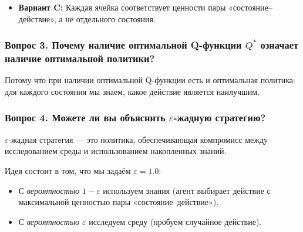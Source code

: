 \documentclass[11pt,a4paper]{article}
\begin{document}
\begin{itemize}
\tightlist
\item
  \textbf{Вариант C:} Каждая ячейка соответствует ценности пары «состояние--действие», а не отдельного состояния.
\end{itemize}

\subsubsection{\texorpdfstring{Вопрос 3. Почему наличие оптимальной Q-функции \(Q^*\) означает наличие оптимальной политики?}{Вопрос 3. Почему наличие оптимальной Q-функции Q* означает наличие оптимальной политики?}}\label{q3-why-if-we-have-an-optimal-q-function-q-we-have-an-optimal-policy-1}

Потому что при наличии оптимальной Q-функции есть и оптимальная политика: для каждого состояния мы знаем, какое действие является наилучшим.


\subsubsection{\texorpdfstring{Вопрос 4. Можете ли вы объяснить \(\varepsilon\)-жадную стратегию?}{Вопрос 4. Можете ли вы объяснить epsilon-жадную стратегию?}}\label{q4-can-you-explain-what-is-epsilon-greedy-strategy-1}

\(\varepsilon\)-жадная стратегия --- это политика, обеспечивающая компромисс между исследованием среды и использованием накопленных знаний.

Идея состоит в том, что мы задаём \(\varepsilon=1.0\):

\begin{itemize}
\tightlist
\item
  С \emph{вероятностью \(1-\varepsilon\)} используем знания (агент выбирает действие с максимальной ценностью пары «состояние--действие»).
\item
  С \emph{вероятностью \(\varepsilon\)} исследуем среду (пробуем случайное действие).
\end{itemize}

\end{document}
